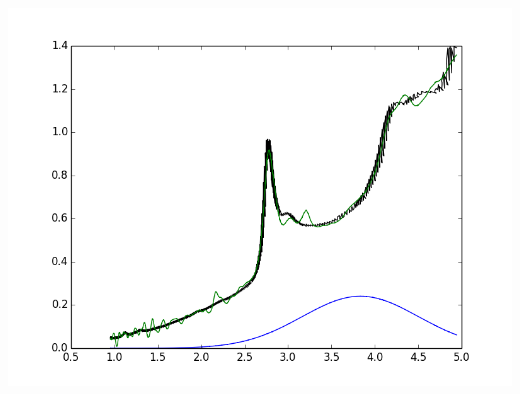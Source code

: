 \documentclass{article}
\begin{document}
\includegraphics{"(6,6) APTE DNA Paper.png"}
\end{document}
